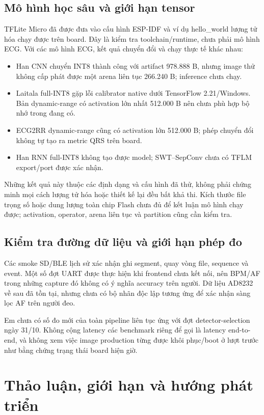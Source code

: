 \documentclass[12pt,a4paper,oneside]{report}
\begin{document}
\section{Mô hình học sâu và giới hạn tensor}
TFLite Micro đã được đưa vào cấu hình ESP-IDF và ví dụ hello\_world lượng tử hóa chạy được trên board. Đây là kiểm tra toolchain/runtime, chưa phải mô hình ECG. Với các mô hình ECG, kết quả chuyển đổi và chạy thực tế khác nhau:
\begin{itemize}
\item Han CNN chuyển INT8 thành công với artifact 978.888 B, nhưng image thử không cấp phát được một arena liên tục 266.240 B; inference chưa chạy.
\item Laitala full-INT8 gặp lỗi calibrator native dưới TensorFlow 2.21/Windows. Bản dynamic-range có activation lớn nhất 512.000 B nên chưa phù hợp bộ nhớ trong đang có.
\item ECG2RR dynamic-range cũng có activation lớn 512.000 B; phép chuyển đổi không tự tạo ra metric QRS trên board.
\item Han RNN full-INT8 không tạo được model; SWT--SepConv chưa có TFLM export/port được xác nhận.
\end{itemize}
Những kết quả này thuộc các định dạng và cấu hình đã thử, không phải chứng minh mọi cách lượng tử hóa hoặc thiết kế lại đều bất khả thi. Kích thước file trọng số hoặc dung lượng toàn chip Flash chưa đủ để kết luận mô hình chạy được; activation, operator, arena liên tục và partition cũng cần kiểm tra.

\section{Kiểm tra đường dữ liệu và giới hạn phép đo}
Các smoke SD/BLE lịch sử xác nhận ghi segment, quay vòng file, sequence và event. Một số đợt UART được thực hiện khi frontend chưa kết nối, nên BPM/AF trong những capture đó không có ý nghĩa accuracy trên người. Dữ liệu AD8232 về sau đã tồn tại, nhưng chưa có bộ nhãn độc lập tương ứng để xác nhận sàng lọc AF trên người đeo.

Em chưa có số đo mới của toàn pipeline liên tục ứng với đợt detector-selection ngày 31/10. Không cộng latency các benchmark riêng để gọi là latency end-to-end, và không xem việc image production từng được khôi phục/boot ở lượt trước như bằng chứng trạng thái board hiện giờ.

\chapter{Thảo luận, giới hạn và hướng phát triển}
\end{document}
